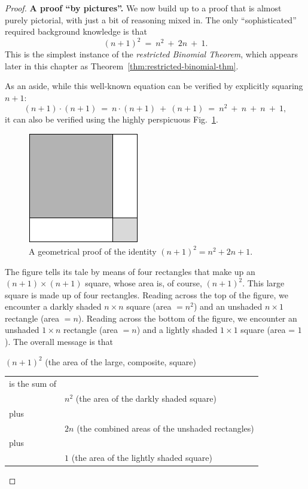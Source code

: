 \begin{proof}
{\bf A proof ``by pictures''.}
%
We now build up to a proof that is almost purely pictorial, with just
a bit of reasoning mixed in.  The only ``sophisticated'' required
background knowledge is that
\[ (n+1)^2 \ = \ n^2 \ + \ 2n \ + \ 1. \]
This is the simplest instance of the {\em restricted Binomial
  Theorem}, which appears later in this chapter as
Theorem~\ref{thm:restricted-binomial-thm}.

As an aside, while this well-known equation can be verified by
explicitly squaring $n+1$:
\[ (n+1) \cdot (n+1) \ = \ n \cdot (n+1) \ + \ (n+1) 
     \ = \ n^2 \ + \ n \ + \ n \ + \ 1,
\]
it can also be verified using the highly perspicuous
Fig.~\ref{fig:proofa2plusb2}.
\begin{figure}[ht]
\begin{center}
       \includegraphics[scale=0.4]{FiguresMaths/proofa2plusb2}
\caption{A geometrical proof of the identity $(n+1)^2 = n^2 + 2n + 1$.}
       \label{fig:proofa2plusb2}
\end{center}
\end{figure}
The figure tells its tale by means of four rectangles that make up an
$(n+1) \times (n+1)$ square, whose area is, of course, $(n+1)^2$.
This large square is made up of four rectangles.  Reading across the
top of the figure, we encounter a darkly shaded $n \times n$ square
(area $= n^2$) and an unshaded $n \times 1$ rectangle (area $= n$).
Reading across the bottom of the figure, we encounter an unshaded $1
\times n$ rectangle (area $= n$) and a lightly shaded $1 \times 1$
square (area = $1$).  The overall message is that

\noindent
$(n+1)^2$ (the area of the large, composite, square)

\begin{tabular}{ll}
is the sum of & \\
  & $n^2$ (the area of the darkly shaded square) \\
plus & \\
  & $2n$ (the combined areas of the unshaded rectangles) \\
plus & \\
  & $1$ (the area of the lightly shaded square)
\end{tabular}


\end{proof}
